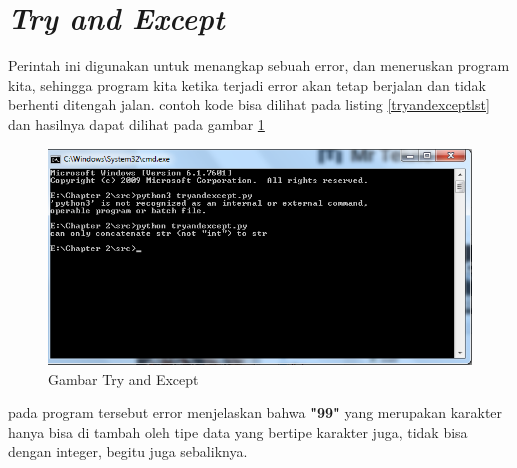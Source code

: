 \section{\textit{Try and Except}}
Perintah ini digunakan untuk menangkap sebuah error, dan meneruskan program kita, sehingga program kita ketika terjadi error akan tetap berjalan dan tidak berhenti ditengah jalan. contoh kode bisa dilihat pada listing \ref{tryandexceptlst} dan hasilnya dapat dilihat pada gambar \ref{tryandexceptgbr}



\begin{figure}[H]
\centering
\includegraphics[width=1\textwidth]{figures/tryandexcept.png}
\caption{Gambar Try and Except}
\label{tryandexceptgbr}
\end{figure}

pada program tersebut error menjelaskan bahwa \textbf{"99"} yang merupakan karakter hanya bisa di tambah oleh tipe data yang bertipe karakter juga, tidak bisa dengan integer, begitu juga sebaliknya.